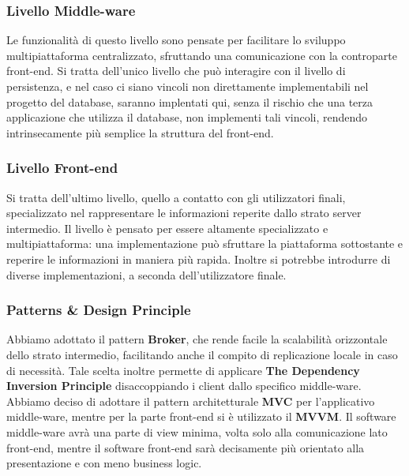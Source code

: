 \documentclass[a4paper]{article}
\begin{document}
\subsubsection{Livello Middle-ware}
Le funzionalità di questo livello sono pensate per facilitare lo sviluppo multipiattaforma centralizzato, sfruttando una comunicazione con la controparte front-end. Si tratta dell'unico livello che può interagire con il livello di persistenza, e nel caso ci siano vincoli non direttamente implementabili nel progetto del database, saranno implentati qui, senza il rischio che una terza applicazione che utilizza il database, non implementi tali vincoli, rendendo intrinsecamente più semplice la struttura del front-end.

\subsubsection{Livello Front-end}
Si tratta dell'ultimo livello, quello a contatto con gli utilizzatori finali, specializzato nel rappresentare le informazioni reperite dallo strato server intermedio. Il livello è pensato per essere altamente specializzato e multipiattaforma: una implementazione può sfruttare la piattaforma sottostante e reperire le informazioni in maniera più rapida. Inoltre si potrebbe introdurre di diverse implementazioni, a seconda dell'utilizzatore finale.\\


\subsubsection{Patterns \& Design Principle}
Abbiamo adottato il pattern \textbf{Broker}, che rende facile la scalabilità orizzontale dello strato intermedio, facilitando anche il compito di replicazione locale in caso di necessità. Tale scelta inoltre permette di applicare \textbf{The Dependency Inversion Principle} disaccoppiando i client dallo specifico middle-ware.\\Abbiamo deciso di adottare il pattern architetturale \textbf{MVC} per l'applicativo middle-ware, mentre per la parte front-end si è utilizzato il \textbf{MVVM}. Il software middle-ware avrà una parte di view minima, volta solo alla comunicazione lato front-end, mentre il software front-end sarà decisamente più orientato alla presentazione e con meno business logic.

\end{document}
